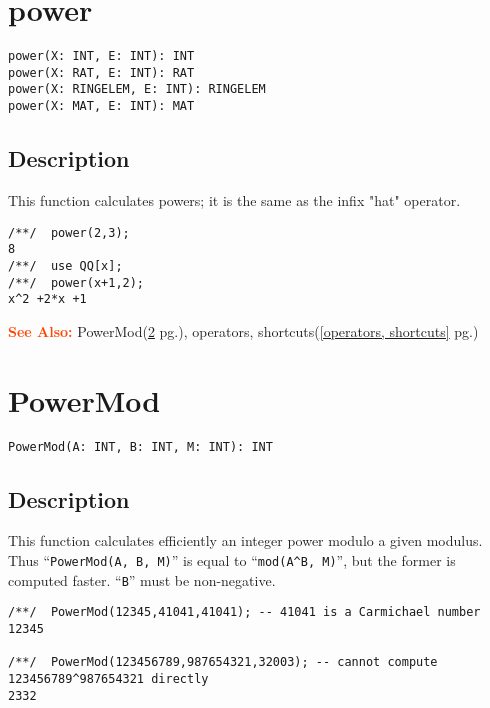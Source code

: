 \documentclass[a4paper]{mybook}
\newenvironment{command}{}{} %
\newcommand\SeeAlso{\par\textcolor{OrangeRed}{\textbf{\large See Also: }}}
\begin{document}
\section{power}
\label{power}
\begin{command} %


\begin{Verbatim}[label=syntax, rulecolor=\color{MidnightBlue},
frame=single]
power(X: INT, E: INT): INT
power(X: RAT, E: INT): RAT
power(X: RINGELEM, E: INT): RINGELEM
power(X: MAT, E: INT): MAT
\end{Verbatim}


\subsection*{Description}

This function calculates powers; it is the same as the infix "hat" operator.
\begin{Verbatim}[label=example, rulecolor=\color{PineGreen}, frame=single]
/**/  power(2,3);
8
/**/  use QQ[x];
/**/  power(x+1,2);
x^2 +2*x +1
\end{Verbatim}


\SeeAlso %
  PowerMod(\ref{PowerMod} pg.\pageref{PowerMod}), 
    operators, shortcuts(\ref{operators, shortcuts} pg.\pageref{operators, shortcuts})
\end{command} %

\section{PowerMod}
\label{PowerMod}
\begin{command} %


\begin{Verbatim}[label=syntax, rulecolor=\color{MidnightBlue},
frame=single]
PowerMod(A: INT, B: INT, M: INT): INT
\end{Verbatim}


\subsection*{Description}

This function calculates efficiently an integer power modulo a given
modulus.  Thus ``\verb&PowerMod(A, B, M)&'' is equal to ``\verb&mod(A^B, M)&'', but the former
is computed faster.  ``\verb&B&'' must be non-negative.
\begin{Verbatim}[label=example, rulecolor=\color{PineGreen}, frame=single]
/**/  PowerMod(12345,41041,41041); -- 41041 is a Carmichael number
12345

/**/  PowerMod(123456789,987654321,32003); -- cannot compute 123456789^987654321 directly
2332
\end{Verbatim}


\end{command} %
\end{document}
